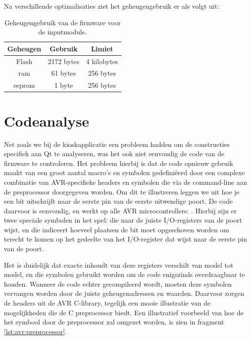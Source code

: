 Na verschillende optimalisaties ziet het geheugengebruik er als volgt uit:
\begin{table}[h!]
  \begin{center}
    \begin{tabular}{c c c}
    Geheugen & Gebruik & Limiet \\
    \hline
    Flash & 2172 bytes & 4 kilobytes \\
    \ac{ram} & 61 bytes & 256 bytes \\
    \ac{eeprom} & 1 byte & 256 bytes \\
    \end{tabular}
  \end{center}
  \caption{Geheugengebruik van de firmware voor de inputmodule.}
\end{table}

\section{Codeanalyse}
\label{inputmodule:firmware:codenalyse}

Net zoals we bij de kioskapplicatie een probleem hadden om de constructies specifiek aan Qt te analyseren, was het ook niet eenvoudig de code van de firmware te controleren. Het probleem hierbij is dat de code opnieuw gebruik maakt van een groot aantal macro's en symbolen gedefiniëerd door een complexe combinatie van AVR-specifieke headers en symbolen die via de command-line aan de preprocessor doorgegeven worden. Om dit te illustreren leggen we uit hoe je een bit uitschrijft naar de eerste pin van de eerste uitwendige poort. De code daarvoor is eenvoudig, en werkt op alle AVR microcontrollers: . Hierbij zijn er twee speciale symbolen in het spel:  die naar de juiste I/O-registers van de poort wijst, en  die indiceert hoeveel plaatsen de bit moet opgeschoven worden om terecht te komen op het gedeelte van het I/O-register dat wijst naar de eerste pin van de poort.

Het is duidelijk dat exacte inhoudt van deze registers verschilt van model tot model, en die symbolen gebruikt worden om de code enigszinds overdraagbaar te houden. Wanneer de code echter gecompileerd wordt, moeten deze symbolen vervangen worden door de juiste geheugenadressen en waarden. Daarvoor zorgen de headers uit de AVR C-library, tegelijk een mooie illustratie van de mogelijkheden die de C preprocessor biedt. Een illustratief voorbeeld van hoe de het  symbool door de preprocessor zal omgezet worden, is zien in fragment \ref{lst:avr:preprocessor}.

